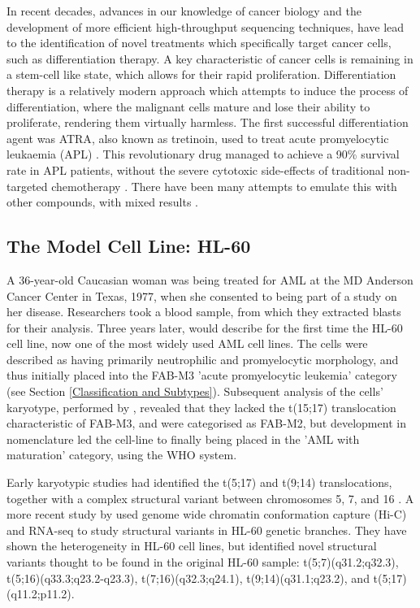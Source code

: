 In recent decades, advances in our knowledge of cancer biology and the development of more efficient high-throughput sequencing techniques, have lead to the identification of novel treatments which specifically target cancer cells, such as differentiation therapy. A key characteristic of cancer cells is remaining in a stem-cell like state, which allows for their rapid proliferation. Differentiation therapy is a relatively modern approach which attempts to induce the process of differentiation, where the malignant cells mature and lose their ability to proliferate, rendering them virtually harmless. The first successful differentiation agent was \ac{ATRA}, also known as tretinoin, used to treat acute promyelocytic leukaemia (APL) \citep{chomienne1990all}. This revolutionary drug managed to achieve a 90\% survival rate in APL patients, without the severe cytotoxic side-effects of traditional non-targeted chemotherapy \citep{kim2015selection}. There have been many attempts to emulate this with other compounds, with mixed results \citep{nowak2009differentiation}.

\subsection{The Model Cell Line: HL-60 }
A 36-year-old Caucasian woman was being treated for \ac{AML} at the MD Anderson Cancer Center in Texas, 1977, when she consented to being part of a study on her disease. Researchers took a blood sample, from which they extracted blasts for their analysis. Three years later, \cite{gallagher1979characterization} would describe for the first time the HL-60 cell line, now one of the most widely used \ac{AML} cell lines. The cells were described as having primarily neutrophilic and promyelocytic morphology, and thus initially placed into the \ac{FAB}-M3 'acute promyelocytic leukemia' category (see Section \ref{Classification and Subtypes}). Subsequent analysis of the cells' karyotype, performed by \cite{dalton1988hl}, revealed that they lacked the t(15;17) translocation characteristic of \ac{FAB}-M3, and were categorised as \ac{FAB}-M2, but development in nomenclature led the cell-line to finally being placed in the 'AML with maturation' category, using the \ac{WHO} system.

Early karyotypic studies had identified the t(5;17) \citep{von1990double} and t(9;14) translocations, together with a complex structural variant between chromosomes 5, 7, and 16 \citep{liang1999spectral}. A more recent study by \cite{jacobson2020hi} used genome wide chromatin conformation capture (Hi-C) and RNA-seq to study structural variants in HL-60 genetic branches. They have shown the heterogeneity in HL-60 cell lines, but identified novel structural variants thought to be found in the original HL-60 sample: t(5;7)(q31.2;q32.3), t(5;16)(q33.3;q23.2-q23.3), t(7;16)(q32.3;q24.1), t(9;14)(q31.1;q23.2), and t(5;17)(q11.2;p11.2).


